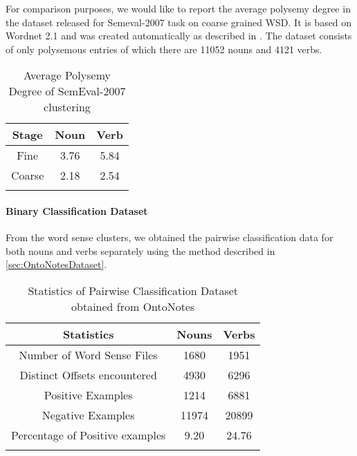 \begin{itemize}
For comparison purposes, we would like to report the average polysemy degree in the dataset released for Semeval-2007 task \citep{navigli-litkowski:SemEval-2007} on coarse grained WSD. It is based on Wordnet 2.1 and was created automatically as described in \citep{Navigli06meaningfulclustering}. The dataset consists of only polysemous entries of which there are 11052 nouns and 4121 verbs.

\begin{center}
\begin{longtable}{| c | c | c |}  
    \hline
    Stage & Noun & Verb \\ \hline
    Fine & 3.76 & 5.84 \\ \hline
    Coarse & 2.18 & 2.54 \\ \hline
    \caption{Average Polysemy Degree of SemEval-2007 clustering}
\end{longtable}
\end{center}
\end{itemize}

\paragraph{Binary Classification Dataset}
From the word sense clusters, we obtained the pairwise classification data for both nouns and verbs separately using the method described in \ref{sec:OntoNotesDataset}.
\begin{center}
\begin{longtable}{| c | c | c |}  
    \hline
    Statistics & Nouns & Verbs \\ \hline
    Number of Word Sense Files & 1680 & 1951 \\ \hline
    Distinct Offsets encountered & 4930 & 6296 \\ \hline
    Positive Examples & 1214 &  6881\\ \hline
    Negative Examples & 11974 & 20899 \\ \hline
    Percentage of Positive examples & 9.20 & 24.76 \\ \hline
    \caption{Statistics of Pairwise Classification Dataset obtained from OntoNotes}
  \label{tab:ontoNotesPairwiseData}
\end{longtable}
\end{center}

